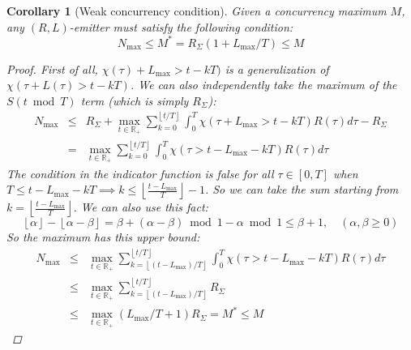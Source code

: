 \documentclass[10pt]{report}
\newcommand{\floor}[1]{\left\lfloor #1 \right\rfloor}
\newtheorem{corollary}{Corollary}
\newenvironment{coro}
	{\begin{shaded}\begin{corollary}}
	{\end{corollary}\end{shaded}}
\begin{document}
\begin{coro}[Weak concurrency condition]
Given a concurrency maximum $M$, any $(R,L)$-emitter must satisfy the following condition:
\begin{equation}\boxed{N_{\max}\leq M^*=R_\Sigma(1+L_{\max}/T)\leq M}\end{equation}
\begin{proof} First of all, $\chi(\tau)+L_{\max}>t-kT)$ is a generalization of $\chi(\tau+L(\tau)>t-kT)$. We can also independently take the maximum of the $S(t\bmod T)$ term (which is simply $R_\Sigma$):
\begin{eqnarray}
N_{\max}&\leq&R_\Sigma+\max_{t\in\mathbb{R_+}}\sum_{k=0}^{\floor{t/T}}\int_0^T\chi(\tau+L_{\max}>t-kT)R(\tau)d\tau-R_\Sigma\\
&=&\max_{t\in\mathbb{R_+}}\sum_{k=0}^{\floor{t/T}}\int_0^T\chi(\tau>t-L_{\max}-kT)R(\tau)d\tau
\end{eqnarray}
The condition in the indicator function is false for all $\tau\in[0,T]$ when $T\leq t-L_{\max}-kT\implies k\leq\floor{\frac{t-L_{\max}}{T}}-1$. So we can take the sum starting from $k=\floor{\frac{t-L_{\max}}{T}}$. We can also use this fact:
\begin{equation}\floor{\alpha}-\floor{\alpha-\beta}=\beta+(\alpha-\beta)\bmod1-\alpha\bmod1\leq\beta+1,\quad(\alpha,\beta\geq0)\end{equation}
So the maximum has this upper bound:
\begin{eqnarray}
N_{\max}&\leq&\max_{t\in\mathbb{R_+}}\sum_{k=\floor{(t-L_{\max})/T}}^{\floor{t/T}}\int_0^T\chi(\tau>t-L_{\max}-kT)R(\tau)d\tau\\
&\leq&\max_{t\in\mathbb{R_+}}\sum_{k=\floor{(t-L_{\max})/T}}^{\floor{t/T}}R_\Sigma\\
&\leq&\max_{t\in\mathbb{R_+}}(L_{\max}/T+1)R_\Sigma=M^*\leq M
\end{eqnarray}
\end{proof}
\end{coro}
\end{document}
